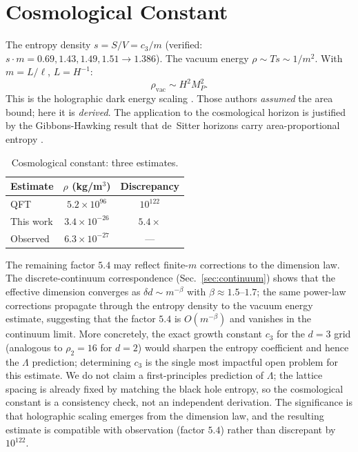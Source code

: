 \documentclass[aps,prl,twocolumn,superscriptaddress]{revtex4-2}
\begin{document}
\section{Cosmological Constant}

The entropy density $s = S/V = c_3/m$ (verified:
$s \cdot m = 0.69, 1.43, 1.49, 1.51 \to 1.386$). The vacuum energy
$\rho \sim Ts \sim 1/m^2$. With $m = L/\ell$, $L = H^{-1}$:
\begin{equation}
\label{eq:lambda}
\rho_{\mathrm{vac}} \sim H^2 M_P^2.
\end{equation}
This is the holographic dark energy scaling \cite{CKN1999}. Those
authors \emph{assumed} the area bound; here it is \emph{derived}. The
application to the cosmological horizon is justified by the
Gibbons-Hawking result that de~Sitter horizons carry area-proportional
entropy \cite{GibbonsHawking1977}.

\begin{table}[h]
\caption{Cosmological constant: three estimates.}
\label{tab:lambda}
\begin{ruledtabular}
\begin{tabular}{lcc}
Estimate & $\rho$ (kg/m$^3$) & Discrepancy \\
\midrule
QFT & $5.2 \times 10^{96}$ & $10^{122}$ \\
This work & $3.4 \times 10^{-26}$ & $5.4\times$ \\
Observed & $6.3 \times 10^{-27}$ & --- \\
\end{tabular}
\end{ruledtabular}
\end{table}

The remaining factor $5.4$ may reflect finite-$m$ corrections to the
dimension law. The discrete-continuum correspondence
(Sec.~\ref{sec:continuum}) shows that the effective dimension
converges as $\delta d \sim m^{-\beta}$ with
$\beta \approx 1.5$--$1.7$; the same power-law corrections propagate
through the entropy density to the vacuum energy estimate, suggesting
that the factor $5.4$ is $O(m^{-\beta})$ and vanishes in the
continuum limit. More concretely, the exact growth constant $c_3$
for the $d=3$ grid (analogous to $\rho_2 = 16$ for $d=2$) would
sharpen the entropy coefficient and hence the $\Lambda$ prediction;
determining $c_3$ is the single most impactful open problem for this
estimate. We do not claim a first-principles prediction of $\Lambda$;
the lattice spacing is already fixed by matching the black hole
entropy, so the cosmological constant is a consistency check, not an
independent derivation. The significance is that holographic scaling
emerges from the dimension law, and the resulting estimate is
compatible with observation (factor $5.4$) rather than discrepant by
$10^{122}$.
\end{document}
